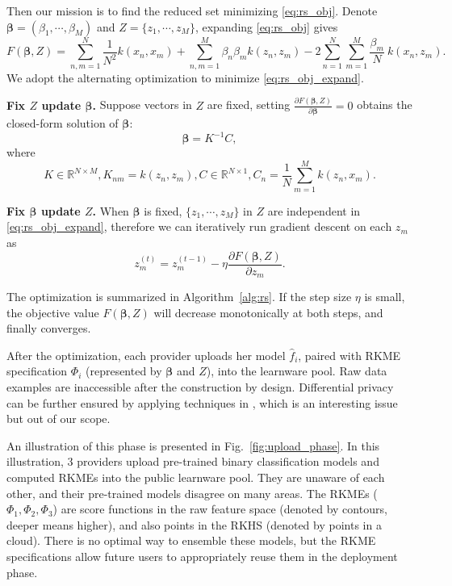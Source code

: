 \documentclass[paper=letter, fontsize=20pt]{article}
\begin{document}
Then our mission is to find the reduced set minimizing \eqref{eq:rs_obj}. Denote $\bm{\beta}=(\beta_1,\cdots,\beta_M)$ and $Z=\{z_1,\cdots,z_M\}$, expanding \eqref{eq:rs_obj} gives
\begin{equation}\label{eq:rs_obj_expand}
     F(\bm{\beta},Z)=\sum_{n,m=1}^N \frac{1}{N^2} k(x_n,x_m)
     +\sum_{n,m=1}^M \beta_n \beta_m k(z_n,z_m) -2 \sum_{n=1}^N \sum_{m=1}^M \frac{\beta_m}{N} \ k(x_n,z_m).
\end{equation}
We adopt the alternating optimization to minimize \eqref{eq:rs_obj_expand}.

\textbf{Fix $Z$ update $\bm{\beta}$.} Suppose vectors in $Z$ are fixed, setting $\frac{\partial F(\bm{\beta},Z)}{\partial \bm{\beta}}=0$ obtains the closed-form solution of $\bm{\beta}$:
\begin{equation} \label{eq:rebeta}
\bm{\beta}=K^{-1}C,
\end{equation}
where
\begin{equation*}
K \in \mathbb{R}^{N\times M}, K_{nm}=k(z_n,z_m), C \in \mathbb{R}^{N\times 1}, C_n=\frac{1}{N}\sum_{m=1}^M k(z_n,x_m).
\end{equation*}

\textbf{Fix $\bm{\beta}$ update $Z$.} When $\bm{\beta}$ is fixed, $\{z_1,\cdots,z_M\}$ in $Z$ are independent in \eqref{eq:rs_obj_expand}, therefore we can iteratively run gradient descent on each $z_m$ as
\begin{equation} \label{eq:re_z}
    z_m^{(t)}=z_m^{(t-1)}-\eta  \frac{\partial F(\bm{\beta},Z)}{\partial z_m}.
\end{equation}

The optimization is summarized in Algorithm~\ref{alg:rs}. If the step size $\eta$ is small, the objective value $F(\bm{\beta},Z)$ will decrease monotonically at both steps, and finally converges.

After the optimization, each provider uploads her model $\widehat{f}_i$, paired with RKME specification $\Phi_i$ (represented by $\bm{\beta}$ and $Z$), into the learnware pool. Raw data examples are inaccessible after the construction by design. Differential privacy can be further ensured by applying techniques in \cite{Priave_Release}, which is an interesting issue but out of our scope. 

An illustration of this phase is presented in Fig.~\ref{fig:upload_phase}. In this illustration, 3 providers upload pre-trained binary classification models and computed RKMEs into the public learnware pool. They are unaware of each other, and their pre-trained models disagree on many areas. The RKMEs ($\Phi_1,\Phi_2,\Phi_3$) are score functions in the raw feature space (denoted by contours, deeper means higher), and also points in the RKHS (denoted by points in a cloud). There is no optimal way to ensemble these models, but the RKME specifications allow future users to appropriately reuse them in the deployment phase.
\end{document}

